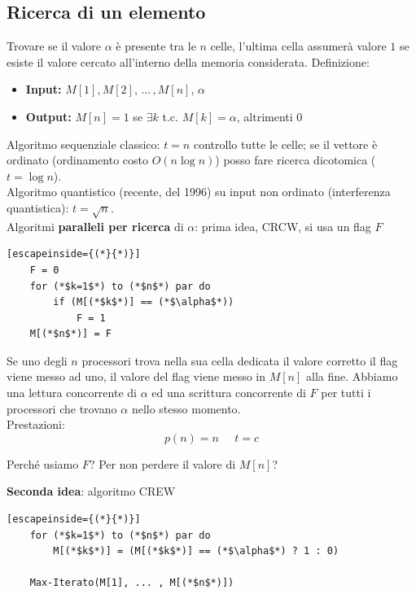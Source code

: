 \documentclass[11pt]{article}
\begin{document}
	\newpage
	
	
	\subsection{Ricerca di un elemento}
	Trovare se il valore $\alpha$ è presente tra le $n$ celle, l'ultima cella assumerà valore $1$ se esiste il valore cercato all'interno della memoria considerata. Definizione: 
	\begin{itemize}
		\item \textbf{Input:} $M[1], M[2], \, ... \, , M[n]$, $\alpha$
		\item \textbf{Output:} $M[n] = 1$ se $\exists k$ t.c. $M[k] =\alpha$, altrimenti $0$
	\end{itemize}
	
	Algoritmo sequenziale classico: $t=n$ controllo tutte le celle; se il vettore è ordinato (ordinamento costo $O(n \log n)$) posso fare ricerca dicotomica ($t = \log n$).\\
	Algoritmo quantistico (recente, del 1996) su input non ordinato (interferenza quantistica): $t = \sqrt{n}$.\\
	
	Algoritmi \textbf{paralleli per ricerca} di $\alpha$: prima idea, CRCW, si usa un flag $F$
	\begin{lstlisting}[escapeinside={(*}{*)}]
	F = 0
	for (*$k=1$*) to (*$n$*) par do
		if (M[(*$k$*)] == (*$\alpha$*))
			F = 1
	M[(*$n$*)] = F
	\end{lstlisting}
	
	Se uno degli $n$ processori trova nella sua cella dedicata il valore corretto il flag viene messo ad uno, il valore del flag viene messo in $M[n]$ alla fine. Abbiamo una lettura concorrente di $\alpha$ ed una scrittura concorrente di $F$ per tutti i processori che trovano $\alpha$ nello stesso momento.\\
	
	Prestazioni: 
	$$ p(n) = n \;\;\;\;\; t = c $$
	
	Perché usiamo $F$? Per non perdere il valore di $M[n]$?
	
	\newpage
	
	\textbf{Seconda idea}: algoritmo CREW
	\begin{lstlisting}[escapeinside={(*}{*)}]
	for (*$k=1$*) to (*$n$*) par do 
		M[(*$k$*)] = (M[(*$k$*)] == (*$\alpha$*) ? 1 : 0)
	
	Max-Iterato(M[1], ... , M[(*$n$*)])
	\end{lstlisting}
	
\end{document}

